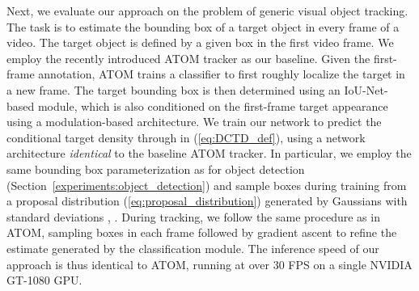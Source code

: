 \documentclass[runningheads]{llncs}
\begin{document}
Next, we evaluate our approach on the problem of generic visual object tracking. The task is to estimate the bounding box of a target object in every frame of a video. The target object is defined by a given box in the first video frame. We employ the recently introduced ATOM \cite{danelljan2019atom} tracker as our baseline. Given the first-frame annotation, ATOM trains a classifier to first roughly localize the target in a new frame. The target bounding box is then determined using an IoU-Net-based module, which is also conditioned on the first-frame target appearance using a modulation-based architecture. We train our network to predict the conditional target density through  in (\ref{eq:DCTD_def}), using a network architecture \emph{identical} to the baseline ATOM tracker. In particular, we employ the same bounding box parameterization as for object detection (Section~\ref{experiments:object_detection}) and sample  boxes during training from a proposal distribution (\ref{eq:proposal_distribution}) generated by  Gaussians with standard deviations , . During tracking, we follow the same procedure as in ATOM, sampling  boxes in each frame followed by gradient ascent to refine the estimate generated by the classification module. The inference speed of our approach is thus identical to ATOM, running at over 30 FPS on a single NVIDIA GT-1080 GPU.
\end{document}
